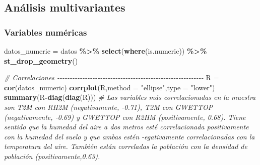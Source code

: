 \documentclass[12pt,a4paper,]{book}
\newenvironment{Shaded}{\begin{snugshade}}{\end{snugshade}}
\newcommand{\AttributeTok}[1]{\textcolor[rgb]{0.13,0.29,0.53}{#1}}
\newcommand{\CommentTok}[1]{\textcolor[rgb]{0.56,0.35,0.01}{\textit{#1}}}
\newcommand{\FunctionTok}[1]{\textcolor[rgb]{0.13,0.29,0.53}{\textbf{#1}}}
\newcommand{\NormalTok}[1]{#1}
\newcommand{\OtherTok}[1]{\textcolor[rgb]{0.56,0.35,0.01}{#1}}
\newcommand{\SpecialCharTok}[1]{\textcolor[rgb]{0.81,0.36,0.00}{\textbf{#1}}}
\newcommand{\StringTok}[1]{\textcolor[rgb]{0.31,0.60,0.02}{#1}}
\numberwithin{dummy}{section}
\theoremstyle{ocrenumbox}
\theoremstyle{blacknumex}
\theoremstyle{blacknumbox}
\theoremstyle{ocrenum}
\theoremstyle{ocrenum}
\begin{document}
\hypertarget{anuxe1lisis-multivariantes}{%
\subsection{Análisis multivariantes}\label{anuxe1lisis-multivariantes}}

\hypertarget{variables-numuxe9ricas}{%
\subsubsection{Variables numéricas}\label{variables-numuxe9ricas}}

\begin{Shaded}
\begin{Highlighting}[]
\NormalTok{datos\_numeric }\OtherTok{=}\NormalTok{ datos }\SpecialCharTok{\%\textgreater{}\%} 
  \FunctionTok{select}\NormalTok{(}\FunctionTok{where}\NormalTok{(is.numeric)) }\SpecialCharTok{\%\textgreater{}\%} 
  \FunctionTok{st\_drop\_geometry}\NormalTok{()}

\CommentTok{\# Correlaciones {-}{-}{-}{-}{-}{-}{-}{-}{-}{-}{-}{-}{-}{-}{-}{-}{-}{-}{-}{-}{-}{-}{-}{-}{-}{-}{-}{-}{-}{-}{-}{-}{-}{-}{-}{-}{-}{-}{-}{-}{-}{-}{-}{-}{-}{-}{-}{-}{-}{-}{-}{-}{-}{-}{-}{-}{-}{-}}
\NormalTok{R }\OtherTok{=} \FunctionTok{cor}\NormalTok{(datos\_numeric)}
\FunctionTok{corrplot}\NormalTok{(R,}\AttributeTok{method =} \StringTok{"ellipse"}\NormalTok{,}\AttributeTok{type =} \StringTok{"lower"}\NormalTok{)}
\FunctionTok{summary}\NormalTok{(R}\SpecialCharTok{{-}}\FunctionTok{diag}\NormalTok{(}\FunctionTok{diag}\NormalTok{(R)))}
\CommentTok{\# Las variables más correlacionadas en la muestra son T2M con RH2M (negativamente, {-}0.71), T2M con GWETTOP (negativamente, {-}0.69) y GWETTOP con R2HM (positivamente, 0.68). Tiene sentido que la humedad del aire a dos metros esté correlacionada positivamente con la humedad del suelo y que ambas estén {-}egativamente correlacionadas con la temperatura del aire. También están correladas la población con la densidad de población (positivamente,0.63).}



\end{Highlighting}
\end{Shaded}
\end{document}
